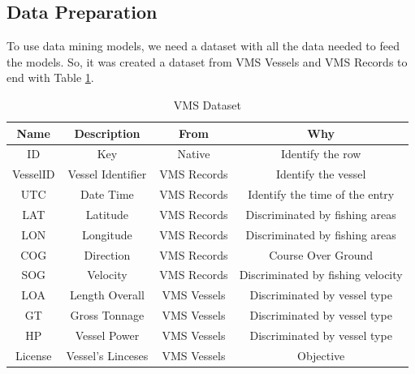 \subsection{Data Preparation} %
\label{sub:data_preparation}
To use data mining models, we need a dataset with all the data needed to feed the models. So, it was created a dataset from VMS Vessels and VMS Records to end with Table \ref{table:vms_dataset}. 

\begin {table}[H]
\begin{center}
\begin{tabular}{c|c|c|c}
\textbf{Name } & \textbf{Description} & \textbf{From} & \textbf{Why} \\
\hline
ID & Key & Native & Identify the row \\
VesselID & Vessel Identifier & VMS Records & Identify the vessel \\
UTC & Date Time & VMS Records &Identify the time of the entry\\
LAT & Latitude & VMS Records & Discriminated by fishing areas\\
LON & Longitude & VMS Records & Discriminated by fishing areas\\
COG & Direction & VMS Records & Course Over Ground\\
SOG & Velocity & VMS Records & Discriminated by fishing velocity\\
LOA & Length Overall & VMS Vessels & Discriminated by vessel type\\
GT & Gross Tonnage & VMS Vessels & Discriminated by vessel type\\
HP &Vessel Power & VMS Vessels & Discriminated by vessel type\\
License & Vessel's Linceses & VMS Vessels & Objective
\label{table:vms_dataset}
\end{tabular}
\caption {VMS Dataset}
\end{center}
\end {table}


